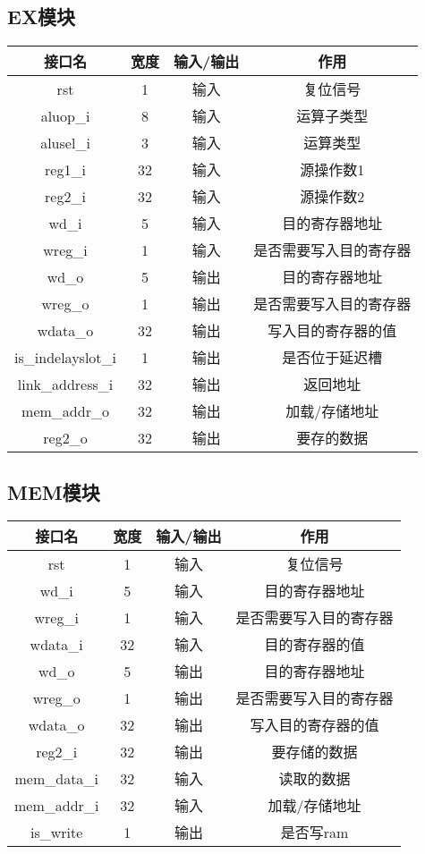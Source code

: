 \newpage
	\subsection{EX模块}
	\begin{table}[!hbp]
		\centering
		\begin{tabular}{|c|c|c|c|}
		\hline
		接口名&宽度&输入/输出&作用\\
		\hline
		rst &1& 输入& 复位信号\\
		\hline
		aluop{\_}i& 8& 输入& 运算子类型\\
		\hline
		alusel{\_}i& 3& 输入& 运算类型\\
		\hline
		reg1{\_}i &32 &输入 &源操作数1\\
		\hline
		reg2{\_}i &32 &输入 &源操作数2\\
		\hline
		wd{\_}i& 5& 输入& 目的寄存器地址\\
		\hline
		wreg{\_}i& 1& 输入& 是否需要写入目的寄存器\\
		\hline
		wd{\_}o& 5& 输出& 目的寄存器地址\\
		\hline
		wreg{\_}o& 1& 输出& 是否需要写入目的寄存器\\
		\hline
		wdata{\_}o& 32& 输出& 写入目的寄存器的值\\
		\hline
		is{\_}indelayslot{\_}i& 1& 输出& 是否位于延迟槽\\
		\hline
		link{\_}address{\_}i &32& 输出& 返回地址\\
		\hline
		mem{\_}addr{\_}o& 32& 输出& 加载/存储地址\\
		\hline
		reg2{\_}o& 32& 输出& 要存的数据\\
		\hline
		\end{tabular}
	\end{table}
	
	\subsection{MEM模块}
	\begin{table}[!hbp]
		\centering
		\begin{tabular}{|c|c|c|c|}
		\hline
		接口名&宽度&输入/输出&作用\\
		\hline
		rst &1& 输入& 复位信号\\
		\hline
		wd{\_}i& 5& 输入& 目的寄存器地址\\
		\hline
		wreg{\_}i& 1& 输入& 是否需要写入目的寄存器\\
		\hline
		wdata{\_}i& 32& 输入& 目的寄存器的值\\
		\hline
		wd{\_}o& 5& 输出& 目的寄存器地址\\
		\hline
		wreg{\_}o& 1& 输出& 是否需要写入目的寄存器\\
		\hline
		wdata{\_}o& 32& 输出& 写入目的寄存器的值\\
		\hline
		reg2{\_}i &32 &输出 &要存储的数据\\
		\hline
		mem{\_}data{\_}i& 32& 输入& 读取的数据\\
		\hline
		mem{\_}addr{\_}i& 32& 输入& 加载/存储地址\\
		\hline
		is{\_}write& 1& 输出& 是否写ram\\
		\hline
		\end{tabular}
	\end{table}